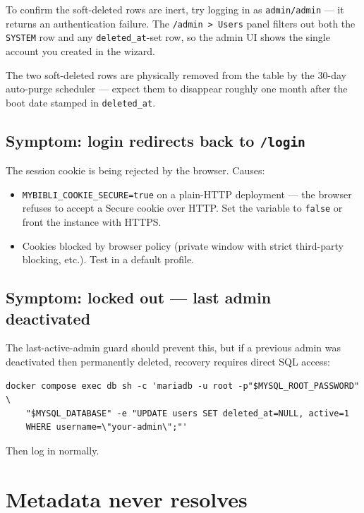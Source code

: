 \begin{tip}
To confirm the soft-deleted rows are inert, try logging in as
\texttt{admin/admin} — it returns an authentication failure. The
\texttt{/admin > Users} panel filters out both the \texttt{SYSTEM}
row and any \texttt{deleted\_at}-set row, so the admin UI shows the
single account you created in the wizard.
\end{tip}

The two soft-deleted rows are physically removed from the table by
the 30-day auto-purge scheduler — expect them to disappear roughly
one month after the boot date stamped in \texttt{deleted\_at}.

\subsection*{Symptom: login redirects back to \texttt{/login}}

The session cookie is being rejected by the browser. Causes:

\begin{itemize}
  \item \texttt{MYBIBLI\_COOKIE\_SECURE=true} on a plain-HTTP
        deployment — the browser refuses to accept a Secure cookie
        over HTTP. Set the variable to \texttt{false} or front the
        instance with HTTPS.
  \item Cookies blocked by browser policy (private window with
        strict third-party blocking, etc.). Test in a default
        profile.
\end{itemize}

\subsection*{Symptom: locked out — last admin deactivated}

The last-active-admin guard should prevent this, but if a previous
admin was deactivated then permanently deleted, recovery requires
direct SQL access:

\begin{lstlisting}
docker compose exec db sh -c 'mariadb -u root -p"$MYSQL_ROOT_PASSWORD" \
    "$MYSQL_DATABASE" -e "UPDATE users SET deleted_at=NULL, active=1
    WHERE username=\"your-admin\";"'
\end{lstlisting}

Then log in normally.

\section{Metadata never resolves}

